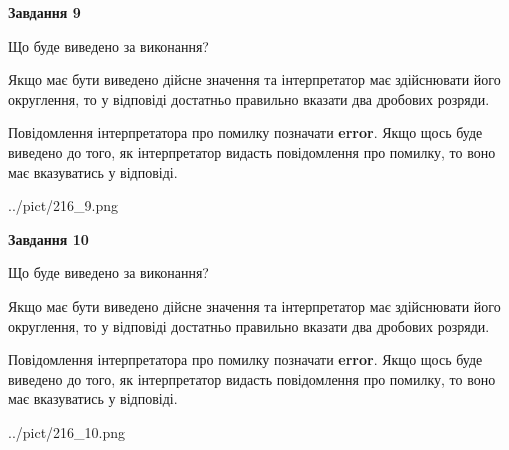 \documentclass[12pt, ukrainian]{article}
\begin{document}
{\begin {Large}
{\begin {center}\textbf{Завдання 9}\end {center}}\par
Що буде виведено за виконання? \par

Якщо має бути виведено дійсне значення та інтерпретатор має здійснювати його округлення, 
то у відповіді достатньо правильно вказати два дробових розряди.

Повідомлення інтерпретатора про помилку позначати \textbf{error}.
Якщо щось буде виведено до того, як інтерпретатор видасть повідомлення про помилку, 
то воно має вказуватись у відповіді. \par

\begin{center}
	{../pict/216_9.png}
\end{center}
\newpage

{\begin {center}\textbf{Завдання 10}\end {center}}\par
Що буде виведено за виконання? \par

Якщо має бути виведено дійсне значення та інтерпретатор має здійснювати його округлення, 
то у відповіді достатньо правильно вказати два дробових розряди.

Повідомлення інтерпретатора про помилку позначати \textbf{error}.
Якщо щось буде виведено до того, як інтерпретатор видасть повідомлення про помилку, 
то воно має вказуватись у відповіді. \par

\begin{center}
	{../pict/216_10.png}
\end{center}
\newpage

\end {Large}}
\end{document}
